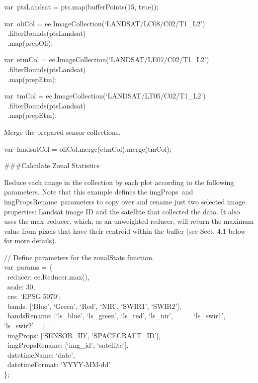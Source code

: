 \documentclass[
  letterpaper,
  DIV=11,
  numbers=noendperiod]{scrreprt}
\begin{document}
var~ptsLandsat = pts.map(bufferPoints(15, true));

var~oliCol = ee.ImageCollection(`LANDSAT/LC08/C02/T1\_L2')\\
\hspace*{0.333em} ~.filterBounds(ptsLandsat)\\
\hspace*{0.333em} ~.map(prepOli);

var~etmCol = ee.ImageCollection(`LANDSAT/LE07/C02/T1\_L2')\\
\hspace*{0.333em} ~.filterBounds(ptsLandsat)\\
\hspace*{0.333em} ~.map(prepEtm);

var~tmCol = ee.ImageCollection(`LANDSAT/LT05/C02/T1\_L2')\\
\hspace*{0.333em} ~.filterBounds(ptsLandsat)\\
\hspace*{0.333em} ~.map(prepEtm);

Merge the prepared sensor collections.

var~landsatCol = oliCol.merge(etmCol).merge(tmCol);

\#\#\#Calculate Zonal Statistics

Reduce each image in the collection by each plot according to the
following parameters. Note that this example defines the imgProps~and
imgPropsRename~parameters to copy over and rename just two selected
image properties: Landsat image ID and the satellite that collected the
data. It also uses the max~reducer, which, as an unweighted reducer,
will return the maximum value from pixels that have their centroid
within the buffer (see Sect. 4.1 below for more details).

// Define parameters for the zonalStats function.\\
var~params = \{\\
\hspace*{0.333em} ~reducer: ee.Reducer.max(),\\
\hspace*{0.333em} ~scale: 30,\\
\hspace*{0.333em} ~crs: `EPSG:5070',\\
\hspace*{0.333em} ~bands: {[}`Blue', `Green', `Red', `NIR', `SWIR1',
`SWIR2'{]},\\
\hspace*{0.333em} ~bandsRename: {[}`ls\_blue', `ls\_green', `ls\_red',
`ls\_nir',~ ~ ~ ~`ls\_swir1', `ls\_swir2'~ ~{]},\\
\hspace*{0.333em} ~imgProps: {[}`SENSOR\_ID', `SPACECRAFT\_ID'{]},\\
\hspace*{0.333em} ~imgPropsRename: {[}`img\_id', `satellite'{]},\\
\hspace*{0.333em} ~datetimeName: `date',\\
\hspace*{0.333em} ~datetimeFormat: `YYYY-MM-dd'\\
\};
\end{document}
